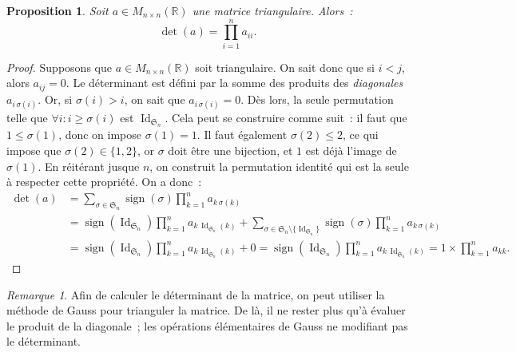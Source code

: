 \documentclass{article}
\DeclareMathOperator{\Id}{Id}
\DeclareMathOperator{\sign}{sign}
\newcommand{\R}{\mathbb R}
\newcommand{\M}[3]{M_{#1 \times #2}(#3)}
\newcommand{\Perm}{\mathfrak{S}}
\newtheorem{prp}[thm]{Proposition}
\theoremstyle{definition}
\theoremstyle{remark}
\newtheorem*{rmq}{Remarque}
\begin{document}
		\begin{prp} Soit $a \in \M nn\R$ une matrice triangulaire. Alors~:
		\[\det(a) = \prod_{i=1}^na_{ii}.\] \end{prp}

		\begin{proof} Supposons que $a \in \M nn\R$ soit triangulaire. On sait donc que si $i < j$, alors $a_{ij} = 0$. Le déterminant est défini par la somme des produits
		des \textit{diagonales} $a_{i\,\sigma(i)}$. Or, si $\sigma(i) > i$, on sait que $a_{i\,\sigma(i)} = 0$. Dès lors, la seule permutation telle que $\forall i : i \geq \sigma(i)$
		est $\Id_{\Perm_n}$. Cela peut se construire comme suit~: il faut que $1 \leq \sigma(1)$, donc on impose $\sigma(1) = 1$. Il faut également $\sigma(2) \leq 2$, ce qui impose que
		$\sigma(2) \in \{1, 2\}$, or $\sigma$ doit être une bijection, et $1$ est déjà l'image de $\sigma(1)$. En réitérant jusque $n$, on construit la permutation identité qui
		est la seule à respecter cette propriété. On a donc~:
		\[\begin{aligned}
			\det(a) &= \sum_{\sigma\in\Perm_n}\sign(\sigma)\prod_{k=1}^na_{k\,\sigma(k)} \\
			&= \sign(\Id_{\Perm_n})\prod_{k=1}^na_{k\,\Id_{\Perm_n}(k)} + \sum_{\sigma \in \Perm_n \setminus \{\Id_{\Perm_n}\}}\sign(\sigma)\prod_{k=1}^na_{k\,\sigma(k)} \\
			&= \sign(\Id_{\Perm_n})\prod_{k=1}^na_{k\,\Id_{\Perm_n}(k)} + 0 = \sign(\Id_{\Perm_n})\prod_{k=1}^na_{k\,\Id_{\Perm_n}(k)} = 1 \times \prod_{k=1}^na_{kk}.
		\end{aligned}\] \end{proof}

		\begin{rmq} Afin de calculer le déterminant de la matrice, on peut utiliser la méthode de Gauss pour trianguler la matrice. De là, il ne rester plus qu'à
		évaluer le produit de la diagonale~; les opérations élémentaires de Gauss ne modifiant pas le déterminant. \end{rmq}
\end{document}
